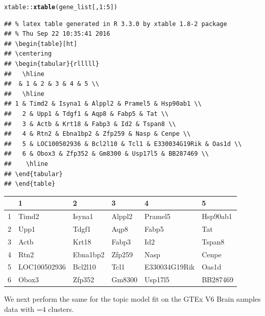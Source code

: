 \documentclass[12pt]{article}\usepackage[]{graphicx}\usepackage[usenames,dvipsnames]{color}
\makeatletter
\newcommand{\hlnum}[1]{\textcolor[rgb]{0.686,0.059,0.569}{#1}}%
\newcommand{\hlopt}[1]{\textcolor[rgb]{0,0,0}{#1}}%
\newcommand{\hlstd}[1]{\textcolor[rgb]{0.345,0.345,0.345}{#1}}%
\newcommand{\hlkwd}[1]{\textcolor[rgb]{0.737,0.353,0.396}{\textbf{#1}}}%
\newenvironment{kframe}{%
 \def\at@end@of@kframe{}%
 \ifinner\ifhmode%
  \def\at@end@of@kframe{\end{minipage}}%
  \begin{minipage}{\columnwidth}%
 \fi\fi%
 \def\FrameCommand##1{\hskip\@totalleftmargin \hskip-\fboxsep
 \colorbox{shadecolor}{##1}\hskip-\fboxsep
     \hskip-\linewidth \hskip-\@totalleftmargin \hskip\columnwidth}%
 \MakeFramed {\advance\hsize-\width
   \@totalleftmargin\z@ \linewidth\hsize
   \@setminipage}}%
 {\par\unskip\endMakeFramed%
 \at@end@of@kframe}
\newenvironment{knitrout}{}{} %
\makeatother
\begin{document}
\begin{knitrout}
\color{fgcolor}\begin{kframe}
\begin{alltt}
\hlstd{xtable}\hlopt{::}\hlkwd{xtable}\hlstd{(gene_list[,}\hlnum{1}\hlopt{:}\hlnum{5}\hlstd{])}
\end{alltt}
\begin{verbatim}
## % latex table generated in R 3.3.0 by xtable 1.8-2 package
## % Thu Sep 22 10:35:41 2016
## \begin{table}[ht]
## \centering
## \begin{tabular}{rlllll}
##   \hline
##  & 1 & 2 & 3 & 4 & 5 \\ 
##   \hline
## 1 & Timd2 & Isyna1 & Alppl2 & Pramel5 & Hsp90ab1 \\ 
##   2 & Upp1 & Tdgf1 & Aqp8 & Fabp5 & Tat \\ 
##   3 & Actb & Krt18 & Fabp3 & Id2 & Tspan8 \\ 
##   4 & Rtn2 & Ebna1bp2 & Zfp259 & Nasp & Cenpe \\ 
##   5 & LOC100502936 & Bcl2l10 & Tcl1 & E330034G19Rik & Oas1d \\ 
##   6 & Obox3 & Zfp352 & Gm8300 & Usp17l5 & BB287469 \\ 
##    \hline
## \end{tabular}
## \end{table}
\end{verbatim}
\end{kframe}
\end{knitrout}

\begin{table}[ht]
\centering
\begin{tabular}{rlllll}
  \hline
 & 1 & 2 & 3 & 4 & 5 \\
  \hline
1 & Timd2 & Isyna1 & Alppl2 & Pramel5 & Hsp90ab1 \\
  2 & Upp1 & Tdgf1 & Aqp8 & Fabp5 & Tat \\
  3 & Actb & Krt18 & Fabp3 & Id2 & Tspan8 \\
  4 & Rtn2 & Ebna1bp2 & Zfp259 & Nasp & Cenpe \\
  5 & LOC100502936 & Bcl2l10 & Tcl1 & E330034G19Rik & Oas1d \\
  6 & Obox3 & Zfp352 & Gm8300 & Usp17l5 & BB287469 \\
   \hline
\end{tabular}
\end{table}

We next perform the same for the topic model fit on the GTEx V6 Brain samples data with =$4$ clusters.
\end{document}
